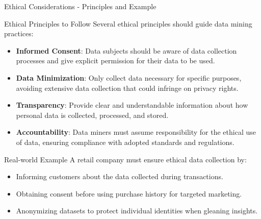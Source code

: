 \documentclass[aspectratio=169]{beamer}
\begin{document}
\begin{frame}[fragile]{Ethical Considerations - Principles and Example}
    \begin{block}{Ethical Principles to Follow}
        Several ethical principles should guide data mining practices:
    \end{block}
    
    \begin{itemize}
        \item \textbf{Informed Consent}: Data subjects should be aware of data collection processes and give explicit permission for their data to be used.
        
        \item \textbf{Data Minimization}: Only collect data necessary for specific purposes, avoiding extensive data collection that could infringe on privacy rights.

        \item \textbf{Transparency}: Provide clear and understandable information about how personal data is collected, processed, and stored.

        \item \textbf{Accountability}: Data miners must assume responsibility for the ethical use of data, ensuring compliance with adopted standards and regulations.
    \end{itemize}

    \begin{block}{Real-world Example}
        A retail company must ensure ethical data collection by:
        \begin{itemize}
            \item Informing customers about the data collected during transactions.
            \item Obtaining consent before using purchase history for targeted marketing.
            \item Anonymizing datasets to protect individual identities when gleaning insights.
        \end{itemize}
    \end{block}
\end{frame}
\end{document}
